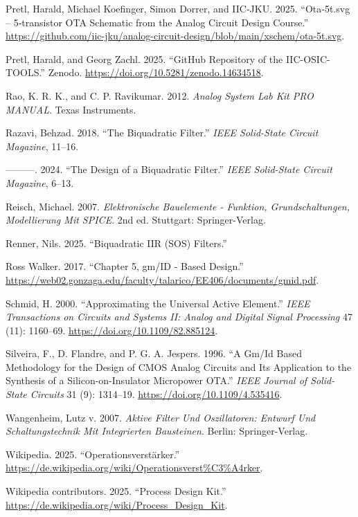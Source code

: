 \documentclass[
  letterpaper,
]{scrbook}
\newlength{\cslhangindent}
\newenvironment{CSLReferences}[2] %
 {\begin{list}{}{%
  \setlength{\itemindent}{0pt}
  \setlength{\leftmargin}{0pt}
  \setlength{\parsep}{0pt}
  \ifodd #1
   \setlength{\leftmargin}{\cslhangindent}
   \setlength{\itemindent}{-1\cslhangindent}
  \fi
  \setlength{\itemsep}{#2\baselineskip}}}
 {\end{list}}
\begin{document}
\begin{CSLReferences}{1}{0}
Pretl, Harald, Michael Koefinger, Simon Dorrer, and IIC‑JKU. 2025.
{``Ota‑5t.svg -- 5‑transistor OTA Schematic from the Analog Circuit
Design Course.''}
\url{https://github.com/iic-jku/analog-circuit-design/blob/main/xschem/ota-5t.svg}.

Pretl, Harald, and Georg Zachl. 2025. {``GitHub Repository of the
IIC-OSIC-TOOLS.''} Zenodo.
\url{https://doi.org/10.5281/zenodo.14634518}.

Rao, K. R. K., and C. P. Ravikumar. 2012. \emph{Analog System Lab Kit
PRO MANUAL}. Texas Instruments.

Razavi, Behzad. 2018. {``The Biquadratic Filter.''} \emph{IEEE
Solid-State Circuit Magazine}, 11--16.

---------. 2024. {``The Design of a Biquadratic Filter.''} \emph{IEEE
Solid-State Circuit Magazine}, 6--13.

Reisch, Michael. 2007. \emph{Elektronische Bauelemente - Funktion,
Grundschaltungen, Modellierung Mit SPICE}. 2nd ed. Stuttgart:
Springer-Verlag.

Renner, Nils. 2025. {``Biquadratic IIR (SOS) Filters.''}

Ross Walker. 2017. {``{Chapter 5, gm/ID - Based Design}.''}
\url{https://web02.gonzaga.edu/faculty/talarico/EE406/documents/gmid.pdf}.

Schmid, H. 2000. {``Approximating the Universal Active Element.''}
\emph{IEEE Transactions on Circuits and Systems II: Analog and Digital
Signal Processing} 47 (11): 1160--69.
\url{https://doi.org/10.1109/82.885124}.

Silveira, F., D. Flandre, and P. G. A. Jespers. 1996. {``A Gm/Id Based
Methodology for the Design of CMOS Analog Circuits and Its Application
to the Synthesis of a Silicon-on-Insulator Micropower OTA.''} \emph{IEEE
Journal of Solid-State Circuits} 31 (9): 1314--19.
\url{https://doi.org/10.1109/4.535416}.

Wangenheim, Lutz v. 2007. \emph{Aktive Filter Und Oszillatoren: Entwurf
Und Schaltungstechnik Mit Integrierten Bausteinen}. Berlin:
Springer-Verlag.

Wikipedia. 2025. {``Operationsverstärker.''}
\url{https://de.wikipedia.org/wiki/Operationsverst\%C3\%A4rker}.

Wikipedia contributors. 2025. {``Process Design Kit.''}
\url{https://de.wikipedia.org/wiki/Process_Design_Kit}.

\end{CSLReferences}


\backmatter
\end{document}
